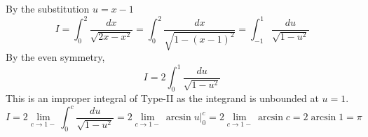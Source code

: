 \documentclass[calc1-main.tex]{subfiles}
\begin{document}
\begin{minipage}{0.5\textwidth}
\begin{solution}
By the substitution $u = x-1$
\[
	I = \int_0^2 \frac{dx}{\sqrt{2x-x^2}} =
	\int_0^2 \frac{dx}{\sqrt{1-(x-1)^2}} =
	\int_{-1}^1 \frac{du}{\sqrt{1-u^2}}
\]
By the even symmetry,
\[
	I = 2\int_0^1 \frac{du}{\sqrt{1-u^2}}
\]
This is an improper integral of Type-II as the integrand is unbounded at $u=1$.
\[
	I = 2 \lim_{c \to 1-} \int_0^c \frac{du}{\sqrt{1-u^2}} =
	2 \lim_{c \to 1-} \left. \arcsin u \right \vert_0^c =
	2 \lim_{c \to 1-} \arcsin c = 2 \arcsin 1 = \pi
\]
\end{solution}
\end{minipage}%
\begin{minipage}{0.5\textwidth}
  \begin{figure}[H]
  	\centering
  \end{figure}
\end{minipage}
\end{document}

